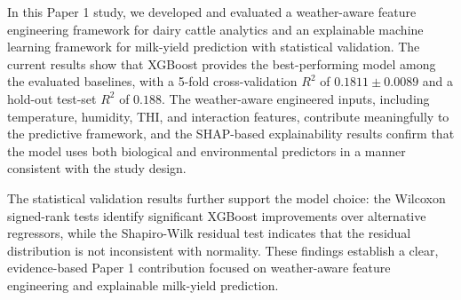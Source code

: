 \documentclass[conference]{IEEEtran}
\begin{document}
		In this Paper 1 study, we developed and evaluated a weather-aware feature engineering framework for dairy cattle analytics and an explainable machine learning framework for milk-yield prediction with statistical validation. The current results show that XGBoost provides the best-performing model among the evaluated baselines, with a 5-fold cross-validation $R^2$ of $0.1811 \pm 0.0089$ and a hold-out test-set $R^2$ of $0.188$. The weather-aware engineered inputs, including temperature, humidity, THI, and interaction features, contribute meaningfully to the predictive framework, and the SHAP-based explainability results confirm that the model uses both biological and environmental predictors in a manner consistent with the study design.
		
		The statistical validation results further support the model choice: the Wilcoxon signed-rank tests identify significant XGBoost improvements over alternative regressors, while the Shapiro-Wilk residual test indicates that the residual distribution is not inconsistent with normality. These findings establish a clear, evidence-based Paper 1 contribution focused on weather-aware feature engineering and explainable milk-yield prediction.
		
\end{document}
